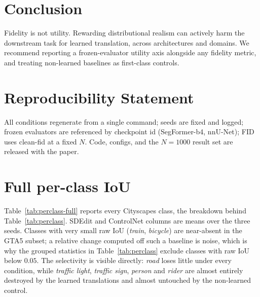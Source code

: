 \section{Conclusion}
Fidelity is not utility. Rewarding distributional realism can actively harm the
downstream task for learned translation, across architectures and domains. We
recommend reporting a frozen-evaluator utility axis alongside any fidelity metric,
and treating non-learned baselines as first-class controls.

\section*{Reproducibility Statement}
All conditions regenerate from a single command; seeds are fixed and logged; frozen
evaluators are referenced by checkpoint id (SegFormer-b4, nnU-Net); FID uses
clean-fid at a fixed $N$. Code, configs, and the $N{=}1000$ result set are released
with the paper.

\appendix
\section{Full per-class IoU}
\label{app:perclass}
Table~\ref{tab:perclass-full} reports every Cityscapes class, the breakdown behind
Table~\ref{tab:perclass}. SDEdit and ControlNet columns are means over the three seeds. Classes
with very small raw IoU (\emph{train}, \emph{bicycle}) are near-absent in the GTA5 subset; a
relative change computed off such a baseline is noise, which is why the grouped statistics in
Table~\ref{tab:perclass} exclude classes with raw IoU below $0.05$. The selectivity is visible
directly: \emph{road} loses little under every condition, while \emph{traffic light},
\emph{traffic sign}, \emph{person} and \emph{rider} are almost entirely destroyed by the learned
translations and almost untouched by the non-learned control.

